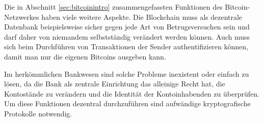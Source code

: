 Die in Abschnitt \ref{sec:bitcoinintro} zusammengefassten Funktionen des Bitcoin-Netzwerkes haben viele weitere Aspekte.
Die Blockchain muss als dezentrale Datenbank beispielsweise sicher gegen jede Art von Betrugsversuchen sein und darf daher von niemandem selbstständig verändert werden können.
Auch muss sich beim Durchführen von Transaktionen der Sender authentifizieren können, damit man nur die eigenen Bitcoins ausgeben kann.

Im herkömmlichen Bankwesen sind solche Probleme inexistent oder einfach zu lösen, da die Bank als zentrale Einrichtung das alleinige Recht hat, die Kontostände zu verändern und die Identität der Kontoinhabenden zu überprüfen.
Um diese Funktionen dezentral durchzuführen sind aufwändige kryptografische Protokolle notwendig.
